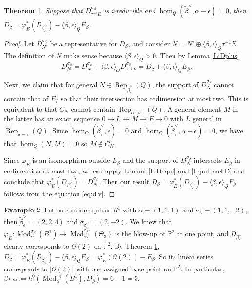 \documentclass{amsart}
\newtheorem{theorem}{Theorem}[section]
\theoremstyle{definition}
\newtheorem{example}[theorem]{Example}
\theoremstyle{remark}
\numberwithin{equation}{section}
\begin{document}
\begin{theorem} \label {T:IAD}
Suppose that $D_{\tau^{-1} E}^{\sigma_\beta}$ is irreducible and $\hom_Q(\tilde{\beta}_\epsilon^\vee,\alpha-\epsilon)=0$, then $D_\beta=\varphi_E^*(D_{\beta_\epsilon^\vee})-{\langle{\beta,\epsilon}\rangle}_Q E_\beta$.
\end{theorem}

\begin{proof} Let $D_{N'}^{\sigma_\beta}$ be a representative for $D_\beta$, and consider $N=N'\oplus {\langle{\beta,\epsilon}\rangle}_Q\tau^{-1} E$. The definition of $N$ make sense because ${\langle{\beta,\epsilon}\rangle}_Q>0$.
Then by Lemma \ref{L:Dplus} \begin{equation} \label{eq:div} D_{N}^{\sigma_\beta}=D_{N'}^{\sigma_\beta}+{\langle{\beta,\epsilon}\rangle}_QD_{\tau^{-1} E}^{\sigma_\beta}=D_\beta+{\langle{\beta,\epsilon}\rangle}_QE_\beta.\end{equation}

Next, we claim that for general $N\in{\operatorname{Rep}}_{\tilde{\beta}_\epsilon^\vee}(Q)$, the support of $D_N^{\sigma_\beta}$ cannot contain that of $E_\beta$ so that their intersection has codimension at most two. This is equivalent to that $C_N$ cannot contain ${\operatorname{Rep}}_{\alpha\twoheadrightarrow\epsilon}(Q)$. A general element $M$ in the latter has an exact sequence $0\to L\to M\to E\to 0$ with $L$ general in ${\operatorname{Rep}}_{\alpha-\epsilon}(Q)$. Since $\hom_Q(\tilde{\beta}_\epsilon^\vee,\epsilon)=0$ and $\hom_Q(\tilde{\beta}_\epsilon^\vee,\alpha-\epsilon)=0$, we have that $\hom_Q(N,M)=0$ so $M\notin C_N$.

Since $\varphi_E$ is an isomorphism outside $E_\beta$ and the support of $D_N^{\sigma_\beta}$ intersects $E_\beta$ in codimension at most two, we can apply Lemma \ref{L:Dequi} and \ref{L:pullbackD} and conclude that $\varphi_E^*(D_{\beta_\epsilon^\vee})=D_N^{\sigma_\beta}$.
Then our result $D_\beta=\varphi_E^*(D_{\beta_\epsilon^\vee})-{\langle{\beta,\epsilon}\rangle}_Q E_\beta$ follows from the equation \eqref{eq:div}.

\end{proof}

\begin{example} Let us consider quiver $B^1$ with $\alpha=(1,1,1)$ and $\sigma_\beta=(1,1,-2)$, then $\tilde{\beta}_\epsilon^\vee=(2,2,4)$ and $\sigma_{\beta_\epsilon^\vee}=(2,-2)$. We knew that $\varphi_E:{\operatorname{Mod}}_\alpha^{\sigma_\beta}(B^1)\to{\operatorname{Mod}}_{\alpha_\epsilon}^{\sigma_{\beta_\epsilon^\vee}}(\Theta_3)$ is the blow-up of ${\mathbb{{P}}}^2$ at one point, and $D_{\beta_\epsilon^\vee}$ clearly corresponds to ${\mathcal{{O}}}(2)$ on ${\mathbb{{P}}}^2$. By Theorem \ref{T:IAD}, $D_\beta=\varphi_E^*(D_{\beta_\epsilon^\vee})-{\langle{\beta,\epsilon}\rangle}_Q E_\beta=\varphi_E^*({\mathcal{{O}}}(2))-E_\beta$. So its linear series corresponds to $|{\mathcal{{O}}}(2)|$ with one assigned base point on ${\mathbb{{P}}}^2$. In particular, $\beta\circ\alpha:=h^0({\operatorname{Mod}}_\alpha^{\sigma_\beta}(B^1),D_\beta)=6-1=5$.
\end{example}
\end{document}
